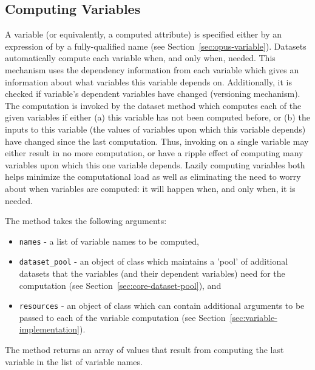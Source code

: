 %
\subsection{Computing Variables}
%
\label{sec:core-dataset-compute-variables}
%
A variable (or equivalently, a computed attribute) is specified either by an expression of by a 
fully-qualified name (see Section~\ref{sec:opus-variable}).
Datasets \datasetindex automatically compute each variable \variablesindex when, and only when,
needed.   This mechanism uses the dependency information
from each variable \variablesindex which gives an information about what variables \variablesindex this
variable \variablesindex depends on. Additionally, it is checked if variable's \variablesindex dependent
variables \variablesindex have changed (versioning mechanism).  The computation is invoked by
the dataset \datasetindex method  which computes each of the
given variables \variablesindex if either (a) this variable \variablesindex has not been computed before, or
(b) the inputs to this variable \variablesindex (the values of variables \variablesindex upon which this
variable \variablesindex depends) have changed since the last computation.  Thus, invoking
 \variablesindex on a single variable \variablesindex may either result in no more
computation, or have a ripple effect of computing many variables \variablesindex upon which
this one variable \variablesindex depends.  Lazily computing variables \variablesindex both helps minimize the
computational load as well as eliminating the need to worry about when
variables \variablesindex are computed: it will happen when, and only when, it is needed.

The method  \variablesindex takes the following arguments:
\begin{itemize}
\item \verb|names| - a list of
variable \variablesindex names to be computed,
\item \verb|dataset_pool| - an object of class  which
maintains a 'pool' of additional datasets that the variables \variablesindex (and their dependent
variables) \variablesindex need for the computation (see Section~\ref{sec:core-dataset-pool}), and
\item \verb|resources| - an object of class  which can contain additional arguments 
to be passed to each of the variable computation (see Section~\ref{sec:variable-implementation}).
\end{itemize}
The method returns an array of values that result from computing the last variable in the 
list of variable names.


